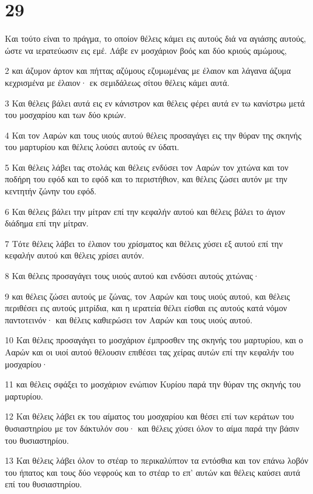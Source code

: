 \chapter{29}

\par Και τούτο είναι το πράγμα, το οποίον θέλεις κάμει εις αυτούς διά να αγιάσης αυτούς, ώστε να ιερατεύωσιν εις εμέ. Λάβε εν μοσχάριον βοός και δύο κριούς αμώμους,
\par 2 και άζυμον άρτον και πήττας αζύμους εζυμωμένας με έλαιον και λάγανα άζυμα κεχρισμένα με έλαιον· εκ σεμιδάλεως σίτου θέλεις κάμει αυτά.
\par 3 Και θέλεις βάλει αυτά εις εν κάνιστρον και θέλεις φέρει αυτά εν τω κανίστρω μετά του μοσχαρίου και των δύο κριών.
\par 4 Και τον Ααρών και τους υιούς αυτού θέλεις προσαγάγει εις την θύραν της σκηνής του μαρτυρίου και θέλεις λούσει αυτούς εν ύδατι.
\par 5 Και θέλεις λάβει τας στολάς και θέλεις ενδύσει τον Ααρών τον χιτώνα και τον ποδήρη του εφόδ και το εφόδ και το περιστήθιον, και θέλεις ζώσει αυτόν με την κεντητήν ζώνην του εφόδ.
\par 6 Και θέλεις βάλει την μίτραν επί την κεφαλήν αυτού και θέλεις βάλει το άγιον διάδημα επί την μίτραν.
\par 7 Τότε θέλεις λάβει το έλαιον του χρίσματος και θέλεις χύσει εξ αυτού επί την κεφαλήν αυτού και θέλεις χρίσει αυτόν.
\par 8 Και θέλεις προσαγάγει τους υιούς αυτού και ενδύσει αυτούς χιτώνας·
\par 9 και θέλεις ζώσει αυτούς με ζώνας, τον Ααρών και τους υιούς αυτού, και θέλεις περιθέσει εις αυτούς μιτρίδια, και η ιερατεία θέλει είσθαι εις αυτούς κατά νόμον παντοτεινόν· και θέλεις καθιερώσει τον Ααρών και τους υιούς αυτού.
\par 10 Και θέλεις προσαγάγει το μοσχάριον έμπροσθεν της σκηνής του μαρτυρίου, και ο Ααρών και οι υιοί αυτού θέλουσιν επιθέσει τας χείρας αυτών επί την κεφαλήν του μοσχαρίου·
\par 11 και θέλεις σφάξει το μοσχάριον ενώπιον Κυρίου παρά την θύραν της σκηνής του μαρτυρίου.
\par 12 Και θέλεις λάβει εκ του αίματος του μοσχαρίου και θέσει επί των κεράτων του θυσιαστηρίου με τον δάκτυλόν σου· και θέλεις χύσει όλον το αίμα παρά την βάσιν του θυσιαστηρίου.
\par 13 Και θέλεις λάβει όλον το στέαρ το περικαλύπτον τα εντόσθια και τον επάνω λοβόν του ήπατος και τους δύο νεφρούς και το στέαρ το επ' αυτών και θέλεις καύσει αυτά επί του θυσιαστηρίου.
